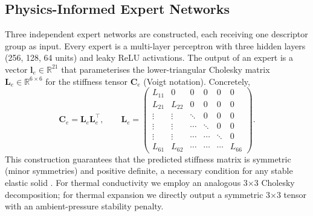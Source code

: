 \documentclass{article}
\begin{document}
\subsection{Physics-Informed Expert Networks}
\label{sec:experts}

Three independent expert networks are constructed, each receiving one descriptor group as input. Every expert is a multi-layer perceptron with three hidden layers (256, 128, 64 units) and leaky ReLU activations. The output of an expert is a vector \(\mathbf{l}_e \in \mathbb{R}^{21}\) that parameterises the lower-triangular Cholesky matrix \(\mathbf{L}_e \in \mathbb{R}^{6\times6}\) for the stiffness tensor \(\mathbf{C}_e\) (Voigt notation). Concretely,
\begin{equation}
    \mathbf{C}_e = \mathbf{L}_e\mathbf{L}_e^{\!\top}, \qquad \mathbf{L}_e = \begin{pmatrix}
    L_{11} & 0 & 0 & 0 & 0 & 0 \\
    L_{21} & L_{22} & 0 & 0 & 0 & 0 \\
    \vdots & \vdots & \ddots & 0 & 0 & 0 \\
    \vdots & \vdots & \cdots & \ddots & 0 & 0 \\
    \vdots & \vdots & \cdots & \cdots & \ddots & 0 \\
    L_{61} & L_{62} & \cdots & \cdots & \cdots & L_{66}
    \end{pmatrix}.
\end{equation}
This construction guarantees that the predicted stiffness matrix is symmetric (minor symmetries) and positive definite, a necessary condition for any stable elastic solid \cite{hill1952elastic}. For thermal conductivity we employ an analogous 3×3 Cholesky decomposition; for thermal expansion we directly output a symmetric 3×3 tensor with an ambient-pressure stability penalty.
\end{document}
